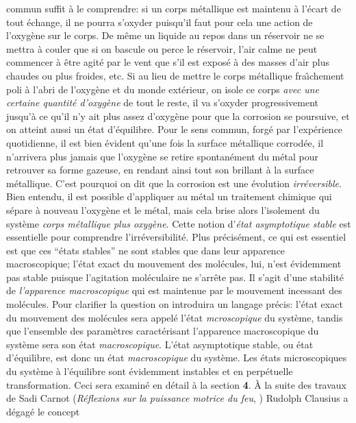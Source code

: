 commun suffit \`a le comprendre: si un corps m\'etallique est maintenu \`a 
l'\'ecart de tout \'echange, il ne pourra s'oxyder puisqu'il faut pour 
cela une action de l'oxyg\`ene sur le corps. De m\^eme un liquide au
repos dans un r\'eservoir ne se mettra \`a couler que si on bascule ou
perce le r\'eservoir, l'air calme ne peut commencer \`a \^etre agit\'e par 
le vent que s'il est expos\'e \`a des masses d'air plus chaudes ou plus 
froides, etc. Si au lieu de mettre le corps m\'etallique fra{\^\i}chement 
poli \`a l'abri de l'oxyg\`ene et du monde ext\'erieur,  on
isole ce corps {\it avec une certaine quantit\'e d'oxyg\`ene} de tout 
le reste, il va s'oxyder progressivement jusqu'\`a ce qu'il n'y ait 
plus assez d'oxyg\`ene pour que la corrosion se poursuive, et on 
atteint aussi un \'etat d'\'equilibre. Pour le sens commun, forg\'e 
par l'exp\'erience quotidienne, il est bien \'evident qu'une fois la 
surface m\'etallique corrod\'ee, il n'arrivera plus jamais que l'oxyg\`ene 
se retire spontan\'ement du m\'etal pour retrouver sa forme gazeuse, en 
rendant ainsi tout son brillant \`a la surface m\'etallique. C'est 
pourquoi on dit que la corrosion est une \'evolution {\it irr\'eversible}. 
Bien entendu, il est possible d'appliquer au m\'etal un traitement chimique 
qui s\'epare \`a nouveau l'oxyg\`ene et le m\'etal, mais cela brise alors
l'isolement du syst\`eme {\it corps m\'etallique plus oxyg\`ene}.
\medskip
Cette notion d'{\it \'etat asymptotique stable} est essentielle pour 
comprendre l'irr\'e\-ver\-si\-bi\-lit\'e. Plus pr\'ecis\'ement, ce qui est 
essentiel est que ces ``\'etats stables'' ne sont stables que dans leur
apparence macroscopique; l'\'etat \hbox{exact} du mouvement des mol\'ecules,
lui, n'est \'evidemment pas stable puisque l'agitation mol\'eculaire ne 
s'arr\^ete pas.  Il s'agit d'une stabilit\'e de {\it l'apparence 
macroscopique} qui est maintenue par le mouvement incessant des mol\'ecules. 
Pour clarifier la question on introduira un langage pr\'ecis:  
l'\'etat exact du mouvement des mol\'ecules sera appel\'e l'\'etat 
{\it mcroscopique} du syst\`eme, tandis que
l'ensemble des param\`etres caract\'erisant l'apparence macroscopique du
syst\`eme sera son \'etat {\it m{\bigsl a\kern0.3pt}croscopique}.
L'\'etat asymptotique stable, ou \'etat d'\'equilibre, est donc un \'etat 
{\it macroscopique} du syst\`eme. Les \'etats microscopiques du 
syst\`eme \`a l'\'equilibre sont \'evidemment instables et en perp\'etuelle 
transformation. Ceci sera examin\'e en d\'etail \`a la section {\bf 4}.
\medskip
\`A la suite des travaux de Sadi Carnot ({\it R\'eflexions sur la puissance 
motrice du feu}, {}) Rudolph Clausius a d\'egag\'e le concept
